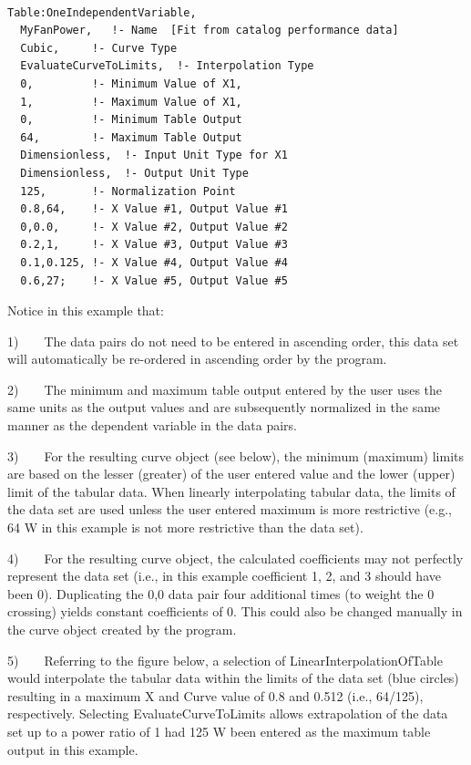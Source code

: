 \begin{lstlisting}

Table:OneIndependentVariable,
  MyFanPower,   !- Name  [Fit from catalog performance data]
  Cubic,     !- Curve Type
  EvaluateCurveToLimits,  !- Interpolation Type
  0,         !- Minimum Value of X1,
  1,         !- Maximum Value of X1,
  0,         !- Minimum Table Output
  64,        !- Maximum Table Output
  Dimensionless,  !- Input Unit Type for X1
  Dimensionless,  !- Output Unit Type
  125,       !- Normalization Point
  0.8,64,    !- X Value #1, Output Value #1
  0,0.0,     !- X Value #2, Output Value #2
  0.2,1,     !- X Value #3, Output Value #3
  0.1,0.125, !- X Value #4, Output Value #4
  0.6,27;    !- X Value #5, Output Value #5
\end{lstlisting}

Notice in this example that:

1)~~~~The data pairs do not need to be entered in ascending order, this data set will automatically be re-ordered in ascending order by the program.

2)~~~~The minimum and maximum table output entered by the user uses the same units as the output values and are subsequently normalized in the same manner as the dependent variable in the data pairs.

3)~~~~For the resulting curve object (see below), the minimum (maximum) limits are based on the lesser (greater) of the user entered value and the lower (upper) limit of the tabular data. When linearly interpolating tabular data, the limits of the data set are used unless the user entered maximum is more restrictive (e.g., 64 W in this example is not more restrictive than the data set).

4)~~~~For the resulting curve object, the calculated coefficients may not perfectly represent the data set (i.e., in this example coefficient 1, 2, and 3 should have been 0). Duplicating the 0,0 data pair four additional times (to weight the 0 crossing) yields constant coefficients of 0. This could also be changed manually in the curve object created by the program.

5)~~~~Referring to the figure below, a selection of LinearInterpolationOfTable would interpolate the tabular data within the limits of the data set (blue circles) resulting in a maximum X and Curve value of 0.8 and 0.512 (i.e., 64/125), respectively. Selecting EvaluateCurveToLimits allows extrapolation of the data set up to a power ratio of 1 had 125 W been entered as the maximum table output in this example.

